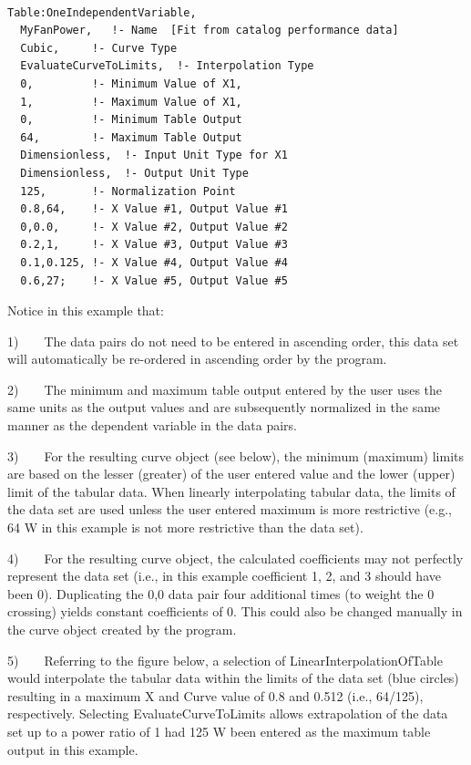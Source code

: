 \begin{lstlisting}

Table:OneIndependentVariable,
  MyFanPower,   !- Name  [Fit from catalog performance data]
  Cubic,     !- Curve Type
  EvaluateCurveToLimits,  !- Interpolation Type
  0,         !- Minimum Value of X1,
  1,         !- Maximum Value of X1,
  0,         !- Minimum Table Output
  64,        !- Maximum Table Output
  Dimensionless,  !- Input Unit Type for X1
  Dimensionless,  !- Output Unit Type
  125,       !- Normalization Point
  0.8,64,    !- X Value #1, Output Value #1
  0,0.0,     !- X Value #2, Output Value #2
  0.2,1,     !- X Value #3, Output Value #3
  0.1,0.125, !- X Value #4, Output Value #4
  0.6,27;    !- X Value #5, Output Value #5
\end{lstlisting}

Notice in this example that:

1)~~~~The data pairs do not need to be entered in ascending order, this data set will automatically be re-ordered in ascending order by the program.

2)~~~~The minimum and maximum table output entered by the user uses the same units as the output values and are subsequently normalized in the same manner as the dependent variable in the data pairs.

3)~~~~For the resulting curve object (see below), the minimum (maximum) limits are based on the lesser (greater) of the user entered value and the lower (upper) limit of the tabular data. When linearly interpolating tabular data, the limits of the data set are used unless the user entered maximum is more restrictive (e.g., 64 W in this example is not more restrictive than the data set).

4)~~~~For the resulting curve object, the calculated coefficients may not perfectly represent the data set (i.e., in this example coefficient 1, 2, and 3 should have been 0). Duplicating the 0,0 data pair four additional times (to weight the 0 crossing) yields constant coefficients of 0. This could also be changed manually in the curve object created by the program.

5)~~~~Referring to the figure below, a selection of LinearInterpolationOfTable would interpolate the tabular data within the limits of the data set (blue circles) resulting in a maximum X and Curve value of 0.8 and 0.512 (i.e., 64/125), respectively. Selecting EvaluateCurveToLimits allows extrapolation of the data set up to a power ratio of 1 had 125 W been entered as the maximum table output in this example.

